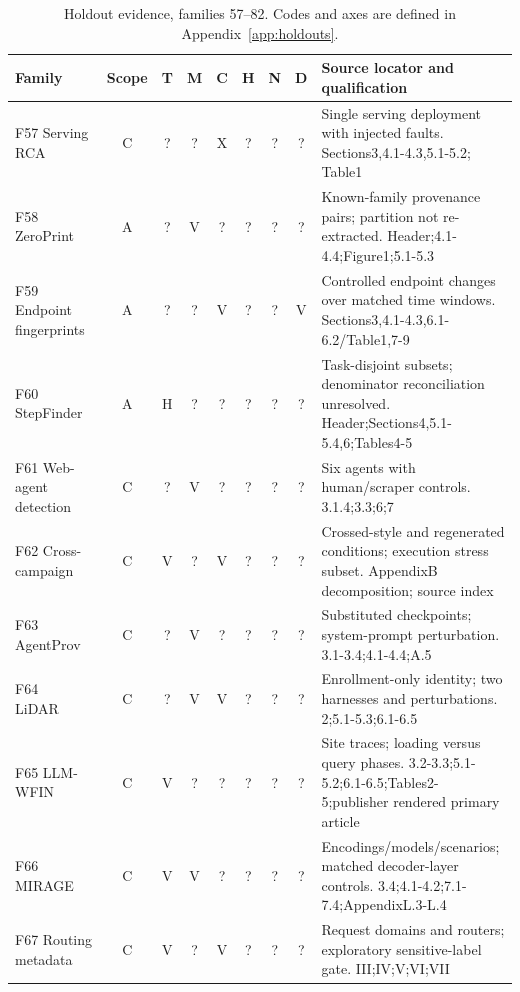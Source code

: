 \begin{table}[p]\centering\footnotesize
\caption{Holdout evidence, families 57--82. Codes and axes are defined in Appendix~\ref{app:holdouts}.}\label{tab:holdouts3}
\setlength{\tabcolsep}{3pt}\begin{tabularx}{\textwidth}{@{}p{}cccccccY@{}}\toprule
Family & Scope & T & M & C & H & N & D & Source locator and qualification\\\midrule
F57 Serving RCA~\cite{scheinert2026rca} & C & ? & ? & X & ? & ? & ? & Single serving deployment with injected faults. Sections3,4.1-4.3,5.1-5.2; Table1\\
F58 ZeroPrint~\cite{shao2026zeroprint} & A & ? & V & ? & ? & ? & ? & Known-family provenance pairs; partition not re-extracted. Header;4.1-4.4;Figure1;5.1-5.3\\
F59 Endpoint fingerprints~\cite{leshin2026endpoint} & A & ? & ? & V & ? & ? & V & Controlled endpoint changes over matched time windows. Sections3,4.1-4.3,6.1-6.2/Table1,7-9\\
F60 StepFinder~\cite{zhu2026stepfinder} & A & H & ? & ? & ? & ? & ? & Task-disjoint subsets; denominator reconciliation unresolved. Header;Sections4,5.1-5.4,6;Tables4-5\\
F61 Web-agent detection~\cite{fayolle2026webagents} & C & ? & V & ? & ? & ? & ? & Six agents with human/scraper controls. 3.1.4;3.3;6;7\\
F62 Cross-campaign~\cite{park2026crosscampaign} & C & V & ? & V & ? & ? & ? & Crossed-style and regenerated conditions; execution stress subset. AppendixB decomposition; source index\\
F63 AgentProv~\cite{wang2026agentprov} & C & ? & V & ? & ? & ? & ? & Substituted checkpoints; system-prompt perturbation. 3.1-3.4;4.1-4.4;A.5\\
F64 LiDAR~\cite{wang2026lidar} & C & ? & V & V & ? & ? & ? & Enrollment-only identity; two harnesses and perturbations. 2;5.1-5.3;6.1-6.5\\
F65 LLM-WFIN~\cite{jiao2025llmwfin} & C & V & ? & ? & ? & ? & ? & Site traces; loading versus query phases. 3.2-3.3;5.1-5.2;6.1-6.5;Tables2-5;publisher rendered primary article\\
F66 MIRAGE~\cite{revankar2026mirage} & C & V & V & ? & ? & ? & ? & Encodings/models/scenarios; matched decoder-layer controls. 3.4;4.1-4.2;7.1-7.4;AppendixL.3-L.4\\
F67 Routing metadata~\cite{chen2026routingmetadata} & C & V & ? & V & ? & ? & ? & Request domains and routers; exploratory sensitive-label gate. III;IV;V;VI;VII\\

\end{tabularx}
\end{table}
